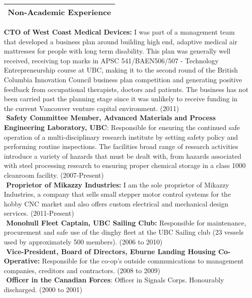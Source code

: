 \documentclass[letterpaper,12pt]{article}
\begin{document}
\noindent \Large \begin{tabular}{|p{12cm}|} \hline \textbf{Non-Academic Experience}\\ \hline \end{tabular} \normalsize
\linebreak
\linebreak
\noindent \textbf{CTO of West Coast Medical Devices:} I was part of a management team that developed a business plan around building high end, adaptive medical air mattresses for people with long term disability. This plan was generally well received, receiving top marks in APSC 541/BAEN506/507 - Technology Entrepreneurship course at UBC, making it to the second round of the British Columbia Innovation Council business plan competition and generating positive feedback from occupational therapists, doctors and patients. The business has not been carried past the planning stage since it was unlikely to receive funding in the current Vancouver venture capital environment.  (2011)\\
$ $ \linebreak
\noindent \textbf{Safety Committee Member, Advanced Materials and Process Engineering Laboratory, UBC}: Responsible for ensuring the continued safe operation of a multi-disciplinary research institute by setting safety policy and performing routine inspections. The facilities broad range of research activities introduce a variety of hazards that must be dealt with, from hazards associated with steel processing research to ensuring proper chemical storage in a class 1000 cleanroom facility. (2007-Present)\\
$ $ \linebreak
\noindent \textbf{Proprietor of Mikazzy Industries:} I am the sole proprietor of Mikazzy Industries, a company that sells small stepper motor control systems for the hobby CNC market and also offers custom electrical and mechanical design services. (2011-Present)  \\
$ $ \linebreak
\noindent \textbf{Monohull Fleet Captain, UBC Sailing Club:} Responsible for maintenance, procurement and safe use of the dinghy fleet at the UBC Sailing club (23 vessels used by approximately 500 members). (2006 to 2010)\\
$ $ \linebreak
 \textbf{Vice-President, Board of Directors, Eburne Landing Housing Co-Operative:} Responsible for the co-op's outside communications to management companies, creditors and contractors. (2008 to 2009) \\
$ $\linebreak
\noindent \textbf{Officer in the Canadian Forces}: Officer in Signals Corps. Honourably discharged. (2000 to 2001)\\
$ $\linebreak
\end{document}
